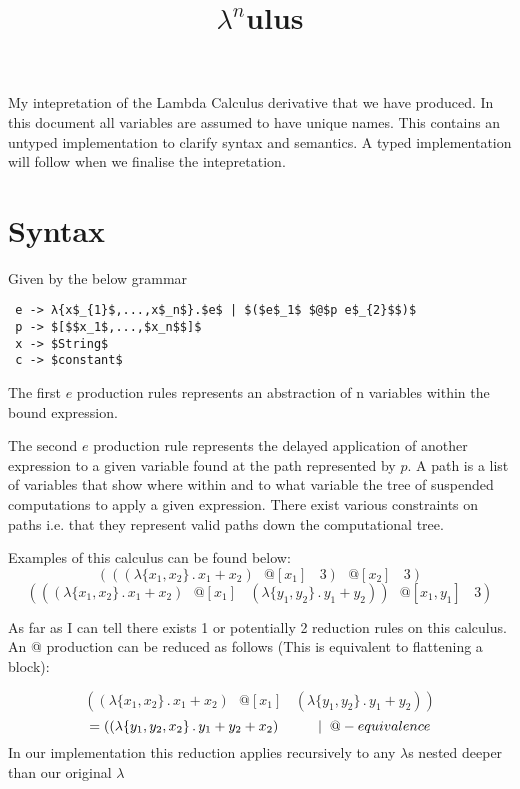 \documentclass{article}
\title{$\lambda^{n}$ulus}
\date{}
\begin{document}
\maketitle
\vspace{-10mm}
\noindent My intepretation of the Lambda Calculus derivative that we have produced. In this document all variables are assumed to have unique names. This contains an untyped implementation to clarify syntax and semantics. A typed implementation will follow when we finalise the intepretation.
\section{Syntax}
Given by the below grammar

\begin{lstlisting}
 e -> λ{x$_{1}$,...,x$_n$}.$e$ | $($e$_1$ $@$p e$_{2}$$)$
 p -> $[$$x_1$,...,$x_n$$]$
 x -> $String$
 c -> $constant$
\end{lstlisting}

\noindent The first $e$ production rules represents an abstraction of n variables within the bound expression. \par
\par
\noindent The second $e$ production rule represents the delayed application of another expression to a given variable found at the path represented by $p$. A path is a list of variables that show where within and to what variable the tree of suspended computations to apply a given expression. There exist various constraints on paths i.e. that they represent valid paths down the computational tree.
\par
\noindent Examples of this calculus can be found below:
\begin{equation}
    (((\lambda\{x_1, x_2\}\,.\, x_1 + x_2) \>\>\>@[x_1] \>\>\>\>3) \>\>\>@[x_2] \>\>\>\>3)
\end{equation}
\begin{equation}
    (((\lambda\{x_1, x_2\}\,.\, x_1 + x_2) \>\>\>@[x_1] \>\>\>\>(\lambda\{y_1, y_2\}\,.\, y_1 + y_2)) \>\>\>@[x_1, y_1] \>\>\>\>3)
\end{equation}

\noindent As far as I can tell there exists 1 or potentially 2 reduction rules on this calculus. An @ production can be reduced as follows (This is equivalent to flattening a block):

\begin{equation}
    ((\lambda\{x_1, x_2\}\,.\, x_1 + x_2) \>\>\>@[x_1]\>\>\>\>(\lambda\{y_1, y_2\}\,.\, y_1 + y_2)) 
\end{equation}
\begin{equation}
   = ((\lambda\{y_1, y_2, x_2\}\,.\, y_1 + y_2 + x_2) \hspace{10mm}|\hspace{2mm}@-equivalence
\end{equation}
\noindent In our implementation this reduction applies recursively to any $\lambda$s nested deeper than our original $\lambda$
\end{document}
